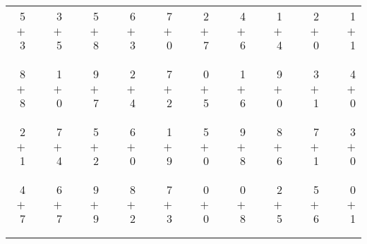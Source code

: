 \documentclass[12pt, letterpaper]{article}
\begin{document}
\begin{tabular}{rrrrrrrrrrrrrrrrrrr}
5 & & 3 & & 5 & & 6 & & 7 & & 2 & & 4 & & 1 & & 2 & & 1\\
$+$ 3 & & $+$ 5 & & $+$ 8 & & $+$ 3 & & $+$ 0 & & $+$ 7 & & $+$ 6 & & $+$ 4 & & $+$ 0 & & $+$ 1\\
\cline{1-1} \cline{3-3} \cline{5-5} \cline{7-7} \cline{9-9} \cline{11-11} \cline{13-13} \cline{15-15} \cline{17-17} \cline{19-19} \\ \\
8 & & 1 & & 9 & & 2 & & 7 & & 0 & & 1 & & 9 & & 3 & & 4\\
$+$ 8 & & $+$ 0 & & $+$ 7 & & $+$ 4 & & $+$ 2 & & $+$ 5 & & $+$ 6 & & $+$ 0 & & $+$ 1 & & $+$ 0\\
\cline{1-1} \cline{3-3} \cline{5-5} \cline{7-7} \cline{9-9} \cline{11-11} \cline{13-13} \cline{15-15} \cline{17-17} \cline{19-19} \\ \\
2 & & 7 & & 5 & & 6 & & 1 & & 5 & & 9 & & 8 & & 7 & & 3\\
$+$ 1 & & $+$ 4 & & $+$ 2 & & $+$ 0 & & $+$ 9 & & $+$ 0 & & $+$ 8 & & $+$ 6 & & $+$ 1 & & $+$ 0\\
\cline{1-1} \cline{3-3} \cline{5-5} \cline{7-7} \cline{9-9} \cline{11-11} \cline{13-13} \cline{15-15} \cline{17-17} \cline{19-19} \\ \\
4 & & 6 & & 9 & & 8 & & 7 & & 0 & & 0 & & 2 & & 5 & & 0\\
$+$ 7 & & $+$ 7 & & $+$ 9 & & $+$ 2 & & $+$ 3 & & $+$ 0 & & $+$ 8 & & $+$ 5 & & $+$ 6 & & $+$ 1\\
\cline{1-1} \cline{3-3} \cline{5-5} \cline{7-7} \cline{9-9} \cline{11-11} \cline{13-13} \cline{15-15} \cline{17-17} \cline{19-19} \\ \\
\end{tabular}
\newpage
\end{document}
